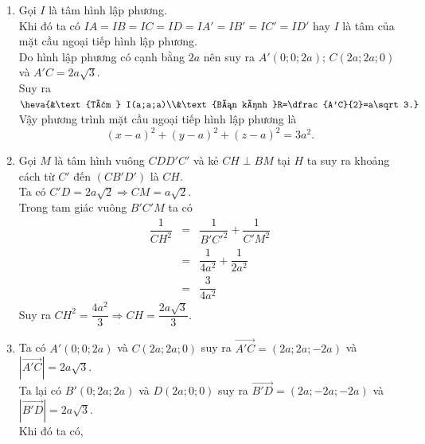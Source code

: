 \begin{bt}
{\begin{center}
		\end{center}
		\begin{enumerate}
			\item Gọi $I$ là tâm hình lập phương.\\
			Khi đó ta có $IA=IB=IC=ID=IA'=IB'=IC'=ID'$ hay $I$ là tâm của mặt cầu ngoại tiếp hình lập phương.\\
			Do hình lập phương có cạnh bằng $2a$ nên suy ra $A'(0;0;2a)$; $C(2a;2a;0)$ và \break $A'C=2a\sqrt 3$.\\
			Suy ra $\heva{&\text{Tâm } I(a;a;a)\\&\text{Bán kính }R=\dfrac{A'C}{2}=a\sqrt 3.}$\\
			Vậy phương trình mặt cầu ngoại tiếp hình lập phương là
			\[(x-a)^2+(y-a)^2+(z-a)^2=3a^2.\]
			\item Gọi $M$ là tâm hình vuông $CDD'C'$ và kẻ $CH\perp BM$ tại $H$ ta suy ra khoảng cách từ $C'$ đến $(CB'D')$ là $CH$.\\
			Ta có $C'D=2a\sqrt 2 \Rightarrow CM=a\sqrt 2$.\\
			Trong tam giác vuông $B'C'M$ ta có
			\allowdisplaybreaks
			\begin{eqnarray*}
				\dfrac{1}{CH^2}&=&\dfrac{1}{B'C'^2}+\dfrac{1}{C'M^2}\\
				&=&\dfrac{1}{4a^2}+\dfrac{1}{2a^2}\\
				&=&\dfrac{3}{4a^2}
			\end{eqnarray*}
			Suy ra $CH^2=\dfrac{4a^2}{3}\Rightarrow CH=\dfrac{2a\sqrt 3}{3}$.
			\item Ta có $A'(0;0;2a)$ và $C(2a;2a;0)$ suy ra $\overrightarrow{A'C}=(2a;2a;-2a)$ và $\left|\overrightarrow{A'C}\right|=2a\sqrt 3$.\\
			Ta lại có $B'(0;2a;2a)$ và $D(2a;0;0)$ suy ra $\overrightarrow{B'D}=(2a;-2a;-2a)$ và $\left|\overrightarrow{B'D}\right|=2a\sqrt 3$.\\
			Khi đó ta có,
			\allowdisplaybreaks
			\begin{eqnarray*}

\end{eqnarray*}
\end{enumerate}}
\end{bt}
